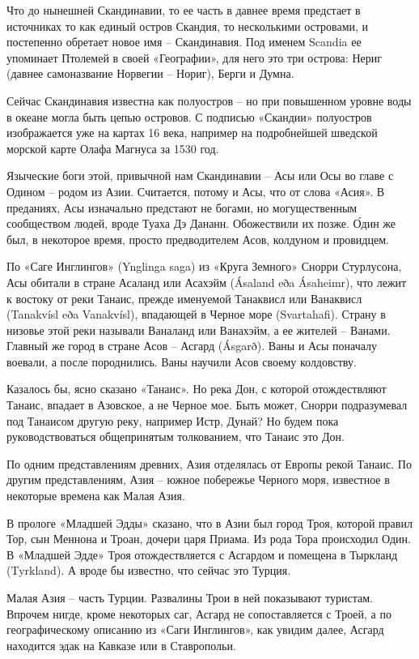 Что до нынешней Скандинавии, то ее часть в давнее время предстает в источниках то как единый остров Скандия, то несколькими островами, и постепенно обретает новое имя – Скандинавия. Под именем Scandia ее упоминает Птолемей в своей «Географии», для него это три острова: Нериг (давнее самоназвание Норвегии – Нориг), Берги и Думна. 

Сейчас Скандинавия известна как полуостров – но при повышенном уровне воды в океане могла быть цепью островов. С подписью «Скандии» полуостров изображается уже на картах 16 века, например на подробнейшей шведской морской карте Олафа Магнуса за 1530 год.

Языческие боги этой, привычной нам Скандинавии – Асы или Осы во главе с Одином – родом из Азии. Считается, потому и Асы, что от слова «Асия». В преданиях, Асы изначально предстают не богами, но могущественным сообществом людей, вроде Туаха Дэ Дананн. Обожествили их позже. \'Один же был, в некоторое время, просто предводителем Асов, колдуном и провидцем.

По «Саге Инглингов» (Ynglinga saga) из «Круга Земного» Снорри Стурлусона, Асы обитали в стране Асаланд или Асахэйм (Ásaland eða Ásaheimr), что лежит к востоку от реки Танаис, прежде именуемой Танаквисл или Ванаквисл (Tanakvísl eða Vanakvísl), впадающей в Черное море (Svartahafi). Страну в низовье этой реки называли Ваналанд или Ванахэйм, а ее жителей – Ванами. Главный же город в стране Асов – Асгард (Ásgarð). Ваны и Асы поначалу воевали, а после породнились. Ваны научили Асов своему колдовству.

Казалось бы, ясно сказано «Танаис». Но река Дон, с которой отождествляют Танаис, впадает в Азовское, а не Черное мое. Быть может, Снорри подразумевал под Танаисом другую реку, например Истр, Дунай? Но будем пока руководствоваться общепринятым толкованием, что Танаис это Дон.

По одним представлениям древних, Азия отделялась от Европы рекой Танаис. По другим представлениям, Азия – южное побережье Черного моря, известное в некоторые времена как Малая Азия.

В прологе «Младшей Эдды» сказано, что в Азии был город Троя, которой правил Тор, сын Меннона и Троан, дочери царя Приама. Из рода Тора происходил Один. В «Младшей Эдде» Троя отождествляется с Асгардом и помещена в Тыркланд (Tyrkland). А вроде бы известно, что сейчас это Турция. 

Малая Азия – часть Турции. Развалины Трои в ней показывают туристам. Впрочем нигде, кроме некоторых саг, Асгард не сопоставляется с Троей, а по географическому описанию из «Саги Инглингов», как увидим далее, Асгард находится эдак на Кавказе или в Ставропольи. 

